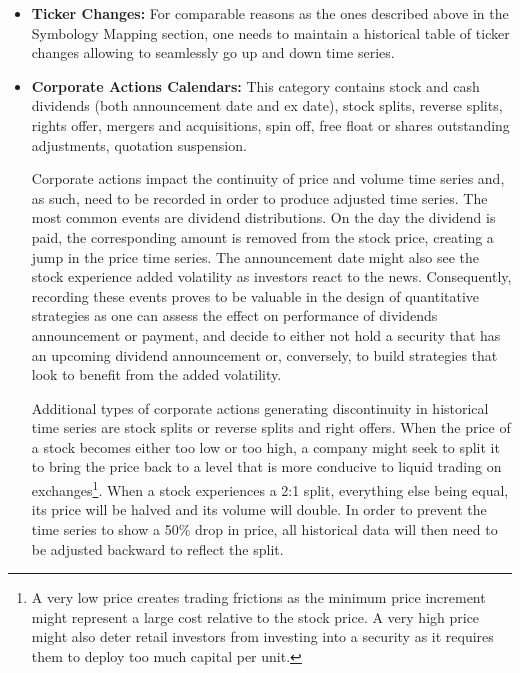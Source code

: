 \begin{itemize}
\begin{itemize}
\hspace*{-0.5cm}{\tt select close from data where date in [$T_0$-10,  $T_0$+20], sym=ABC}

\end{itemize}

\item \textbf{Ticker Changes:} For comparable reasons as the ones described above in the Symbology Mapping section, one needs to maintain a historical table of ticker changes allowing to seamlessly go up and down time series. 


\item \textbf{Corporate Actions Calendars:} This category contains stock and cash dividends (both announcement date and ex date), stock splits, reverse splits, rights offer, mergers and acquisitions, spin off, free float or shares outstanding adjustments, quotation suspension.


Corporate actions impact the continuity of price and volume time series and, as such, need to be recorded in order to produce adjusted time series. The most common events are dividend distributions. On the day the dividend is paid, the corresponding amount is removed from the stock price, creating a jump in the price time series. The announcement date might also see the stock experience added volatility as investors react to the news. Consequently, recording these events proves to be valuable in the design of quantitative strategies as one can assess the effect on performance of dividends announcement or payment, and decide to either not hold a security that has an upcoming dividend announcement or, conversely, to build strategies that look to benefit from the added volatility. 


Additional types of corporate actions generating discontinuity in historical time series are stock splits or reverse splits and right offers. When the price of a stock becomes either too low or too high, a company might seek to split it to bring the price back to a level that is more conducive to liquid trading on exchanges\footnote{A very low price creates trading frictions as the minimum price increment might represent a large cost relative to the stock price. A very high price might also deter retail investors from investing into a security as it requires them to deploy too much capital per unit.}. When a stock experiences a 2:1 split, everything else being equal, its price will be halved and its volume will double. In order to prevent the time series to show a 50\% drop in price, all historical data will then need to be adjusted backward to reflect the split.



\end{itemize}
